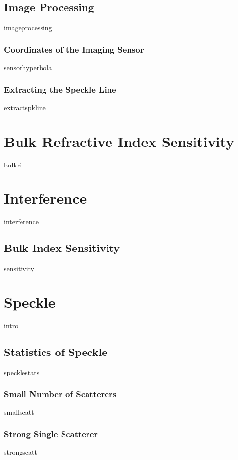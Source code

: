 \documentclass[a4paper,titlepage,onecolumn]{report}
\begin{document}
 \section{Image Processing}
 {imageprocessing}
  \subsection{Coordinates of the Imaging Sensor}
  {sensorhyperbola}
  \subsection{Extracting the Speckle Line}
  {extractspkline}

\chapter{Bulk Refractive Index Sensitivity} \label{ch:bulkri}
{bulkri}

\chapter{Interference} \label{ch:interference}
{interference}
        \section{Bulk Index Sensitivity}
        {sensitivity}

\chapter{Speckle} \label{ch:speckle}
{intro}
 \section{Statistics of Speckle}
        {specklestats}
                \subsection{Small Number of Scatterers}
                {smallscatt}
                \subsection{Strong Single Scatterer}
                {strongscatt}
\end{document}
